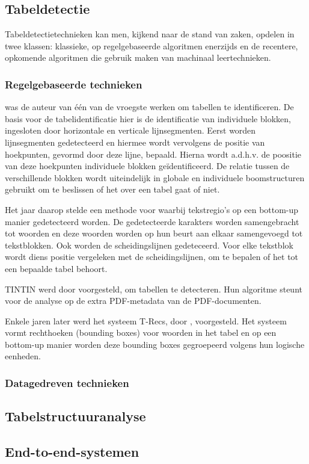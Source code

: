\subsection{Tabeldetectie}
\label{subsec:tabel-detectie}

Tabeldetectietechnieken kan men, kijkend naar de stand van zaken, opdelen in twee klassen: klassieke, op regelgebaseerde algoritmen enerzijds en de recentere, opkomende algoritmen die gebruik maken van machinaal leertechnieken.

\subsubsection{Regelgebaseerde technieken}

\textcite{Watanabe1991} was de auteur van één van de vroegste werken om tabellen te identificeren. De basis voor de tabelidentificatie hier is de identificatie van individuele blokken, ingesloten door horizontale en verticale lijnsegmenten. Eerst worden lijnsegmenten gedetecteerd en hiermee wordt vervolgens de positie van hoekpunten, gevormd door deze lijne, bepaald. Hierna wordt a.d.h.v. de poositie van deze hoekpunten individuele blokken geïdentificeerd. De relatie tussen de verschillende blokken wordt uiteindelijk in globale en individuele boomstructuren gebruikt om te beslissen of het over een tabel gaat of niet.

Het jaar daarop stelde \textcite{Laurentini1992} een methode voor waarbij tekstregio's op een bottom-up manier gedetecteerd worden. De gedetecteerde karakters worden samengebracht tot woorden en deze woorden worden op hun beurt aan elkaar samengevoegd tot tekstblokken. Ook worden de scheidingslijnen gedeteceerd. Voor elke tekstblok wordt diens positie vergeleken met de scheidingslijnen, om te bepalen of het tot een bepaalde tabel behoort.

TINTIN werd door \textcite{Pyreddy1997} voorgesteld, om tabellen te detecteren. Hun algoritme steunt voor de analyse op de extra PDF-metadata van de PDF-documenten.

Enkele jaren later werd het systeem T-Recs, door \textcite{Kieninger2001}, voorgesteld. Het systeem vormt rechthoeken (bounding boxes) voor woorden in het tabel en op een bottom-up manier worden deze bounding boxes gegroepeerd volgens hun logische eenheden. 

\subsubsection{Datagedreven technieken}

\subsection{Tabelstructuuranalyse}
\label{subsec:tabel-structuur-analyse}

\subsection{End-to-end-systemen}
\label{subssec:end-to-end-systemen}

